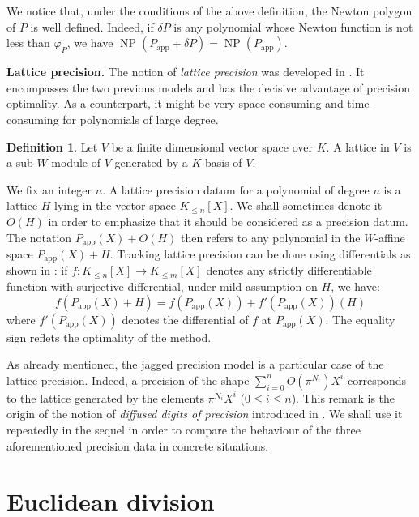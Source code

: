 \documentclass{sig-alternate-05-2015}
\DeclareMathOperator{\NP}{NP}
\newcommand{\app}{\textrm{app}}
\theoremstyle{definition}
\newtheorem{deftn}[theo]{Definition}
\begin{document}
We notice that, under the conditions of the above definition, the
Newton polygon of $P$ is well defined. Indeed, if $\delta P$ is any
polynomial whose Newton function is not less than $\varphi_P$, we
have $\NP(P_\app + \delta P) = \NP(P_\app)$.

\medskip

\noindent
{\bf Lattice precision.}
The notion of \emph{lattice precision} was developed in 
\cite{caruso-roe-vaccon:14a}. It encompasses the two previous models and has
the decisive advantage of precision optimality.
 As a counterpart, it might be very space-consuming and time-consuming 
 for polynomials of large degree.

\begin{deftn}
Let $V$ be a finite dimensional vector space over $K$. A lattice
in $V$ is a sub-$W$-module of $V$ generated by a $K$-basis of
$V$.
\end{deftn}

\noindent
We fix an integer $n$. A lattice precision datum for a polynomial of 
degree $n$ is a lattice $H$ lying in the vector space $K_{\leq n}[X]$. 
We shall sometimes denote it $O(H)$ in order to emphasize that it should 
be considered as a precision datum. The notation $P_\app(X) + O(H)$ then 
refers to any polynomial in the $W$-affine space $P_\app(X) + H$. 
Tracking lattice precision can be done using differentials as shown in
\cite[Lemma~3.4 and Proposition~3.12]{caruso-roe-vaccon:14a}: if $f : K_{\leq n}[X] 
\to K_{\leq m}[X]$ denotes any strictly differentiable function with
surjective differential, under mild assumption on $H$, we have:
$$f(P_\app(X)+H) = f(P_\app(X)) + f'(P_\app(X))(H)$$
where $f'(P_\app(X))$ denotes the differential of $f$ at $P_\app(X)$. 
The equality sign reflets the optimality of the method.

As already mentioned, the jagged precision model is a particular case of 
the lattice precision. Indeed, a precision of the shape $\sum_{i=0}^n 
O(\pi^{N_i}) X^i$ corresponds to the lattice generated by the elements 
$\pi^{N_i} X^i$ ($0 \leq i \leq n$). This remark is the origin of the 
notion of \emph{diffused digits of precision} introduced in 
\cite[Definition~2.3]{caruso-roe-vaccon:15a}. We shall use it repeatedly in the 
sequel in order to compare the behaviour of the three aforementioned 
precision data in concrete situations.

\section{Euclidean division} \label{sec:quo_rem}
\end{document}
